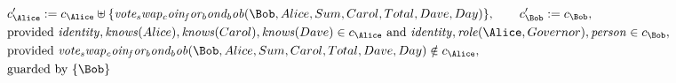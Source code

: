 \begin{align*}
&
c'_
{
\Alice
}
 := 
c_
{
\Alice
}
 \uplus 
\{
\mathit{
vote_swap_coin_for_bond_bob
}
(
\Bob
,
Alice
,
Sum
,
Carol
,
Total
,
Dave
,
Day
)
\}
, \qquad 
c'_
{
\Bob
}
 := 
c_
{
\Bob
}
,\\
&
\text{provided } 
\mathit{
identity
}
,
\mathit{
knows
}
(
Alice
)
,
\mathit{
knows
}
(
Carol
)
,
\mathit{
knows
}
(
Dave
)
 \in c_
{
\Alice
}
 \text{ and } 
\mathit{
identity
}
,
\mathit{
role
}
(
\Alice
,
Governor
)
,
\mathit{
person
}
 \in c_
{
\Bob
}
,\\
&
\text{provided } 
\mathit{
vote_swap_coin_for_bond_bob
}
(
\Bob
,
Alice
,
Sum
,
Carol
,
Total
,
Dave
,
Day
)
 \notin c_
{
\Alice
}
,\\
&
\text{guarded by } \{
\Bob
\}
\end{align*}

